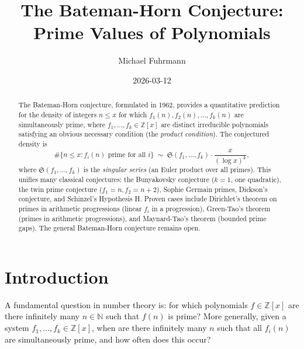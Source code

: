 \documentclass[12pt,a4paper]{amsart}
\theoremstyle{definition}
\theoremstyle{remark}
\newcommand{\Z}{\mathbb{Z}}
\newcommand{\N}{\mathbb{N}}
\newcommand{\BH}{\mathfrak{S}}
\begin{document}

\title{The Bateman-Horn Conjecture:\\
  Prime Values of Polynomials}

\author{Michael Fuhrmann}
\address{Specialist Mathematics Project, Build 167}
\date{2026-03-12}

\begin{abstract}
The Bateman-Horn conjecture, formulated in 1962, provides a quantitative prediction
for the density of integers $n \leq x$ for which $f_1(n), f_2(n), \ldots, f_k(n)$ are
simultaneously prime, where $f_1,\ldots,f_k \in \Z[x]$ are distinct irreducible
polynomials satisfying an obvious necessary condition (the \emph{product condition}).
The conjectured density is
\[
  \#\{n \leq x : f_i(n) \text{ prime for all } i\} \;\sim\;
  \BH(f_1,\ldots,f_k) \cdot \frac{x}{(\log x)^k},
\]
where $\BH(f_1,\ldots,f_k)$ is the \emph{singular series}
(an Euler product over all primes).
This unifies many classical conjectures: the Bunyakovsky conjecture ($k=1$, one quadratic),
the twin prime conjecture ($f_1 = n, f_2 = n+2$), Sophie Germain primes,
Dickson's conjecture, and Schinzel's Hypothesis H.
Proven cases include Dirichlet's theorem on primes in arithmetic progressions
(linear $f_i$ in a progression), Green-Tao's theorem (primes in arithmetic progressions),
and Maynard-Tao's theorem (bounded prime gaps).
The general Bateman-Horn conjecture remains open.
\end{abstract}

\maketitle

\tableofcontents

\section{Introduction}

A fundamental question in number theory is: for which polynomials $f \in \Z[x]$ are
there infinitely many $n \in \N$ such that $f(n)$ is prime?
More generally, given a system $f_1, \ldots, f_k \in \Z[x]$, when are there infinitely
many $n$ such that all $f_i(n)$ are simultaneously prime, and how often does this occur?
\end{document}
